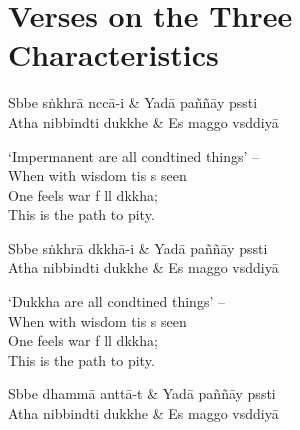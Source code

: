 \chapter{Verses on the Three Characteristics}%

\begin{leader}
\end{leader}

\begin{twochants}
  Sbbe sṅkhrā nccā-i & Yadā paññāy pssti \\
  Atha nibbindti dukkhe & Es maggo vsddiyā \\
\end{twochants}

\begin{english}
  `Impermanent are all condtined things' --\\
  When with wisdom tis s seen\\
  One feels war f ll dkkha;\\
  This is the path to pity.
\end{english}

\begin{twochants}
  Sbbe sṅkhrā dkkhā-i & Yadā paññāy pssti \\
  Atha nibbindti dukkhe & Es maggo vsddiyā \\
\end{twochants}

\begin{english}
  `Dukkha are all condtined things' --\\
  When with wisdom tis s seen\\
  One feels war f ll dkkha;\\
  This is the path to pity.
\end{english}

\begin{twochants}
  Sbbe dhammā anttā-t & Yadā paññāy pssti \\
  Atha nibbindti dukkhe & Es maggo vsddiyā \\
\end{twochants}

